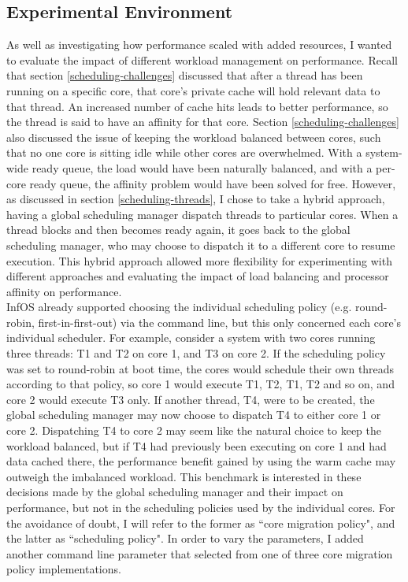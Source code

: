 \documentclass[bsc,frontabs,twoside,singlespacing,parskip,deptreport]{infthesis}     %
\begin{document}
\subsection{Experimental Environment}
As well as investigating how performance scaled with added resources, I wanted to evaluate the impact of different workload management on performance. Recall that section \ref{scheduling-challenges} discussed that after a thread has been running on a specific core, that core's private cache will hold relevant data to that thread. An increased number of cache hits leads to better performance, so the thread is said to have an affinity for that core. Section \ref{scheduling-challenges} also discussed the issue of keeping the workload balanced between cores, such that no one core is sitting idle while other cores are overwhelmed. With a system-wide ready queue, the load would have been naturally balanced, and with a per-core ready queue, the affinity problem would have been solved for free. However, as discussed in section \ref{scheduling-threads}, I chose to take a hybrid approach, having a global scheduling manager dispatch threads to particular cores. When a thread blocks and then becomes ready again, it goes back to the global scheduling manager, who may choose to dispatch it to a different core to resume execution. This hybrid approach allowed more flexibility for experimenting with different approaches and evaluating the impact of load balancing and processor affinity on performance. \\

InfOS already supported choosing the individual scheduling policy (e.g. round-robin, first-in-first-out) via the command line, but this only concerned each core's individual scheduler. For example, consider a system with two cores running three threads: T1 and T2 on core 1, and T3 on core 2. If the scheduling policy was set to round-robin at boot time, the cores would schedule their own threads according to that policy, so core 1 would execute T1, T2, T1, T2 and so on, and core 2 would execute T3 only. If another thread, T4, were to be created, the global scheduling manager may now choose to dispatch T4 to either core 1 or core 2. Dispatching T4 to core 2 may seem like the natural choice to keep the workload balanced, but if T4 had previously been executing on core 1 and had data cached there, the performance benefit gained by using the warm cache may outweigh the imbalanced workload. This benchmark is interested in these decisions made by the global scheduling manager and their impact on performance, but not in the scheduling policies used by the individual cores. For the avoidance of doubt, I will refer to the former as ``core migration policy", and the latter as ``scheduling policy". In order to vary the parameters, I added another command line parameter that selected from one of three core migration policy implementations.
\end{document}

